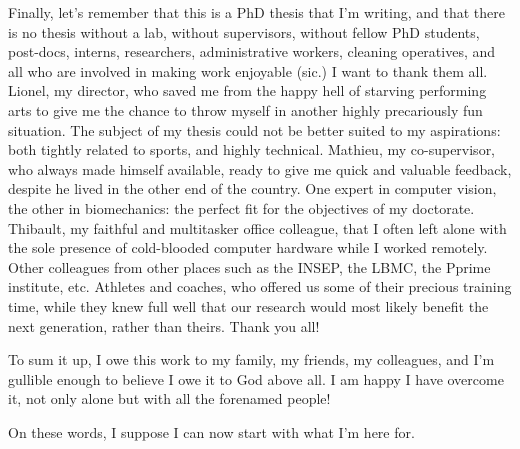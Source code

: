 Finally, let's remember that this is a PhD thesis that I'm writing, and that there is no thesis without a lab, without supervisors, without fellow PhD students, post-docs, interns, researchers, administrative workers, cleaning operatives, and all who are involved in making work enjoyable (sic.) I want to thank them all. Lionel, my director, who saved me from the happy hell of starving performing arts to give me the chance to throw myself in another highly precariously fun situation. The subject of my thesis could not be better suited to my aspirations: both tightly related to sports, and highly technical. Mathieu, my co-supervisor, who always made himself available, ready to give me quick and valuable feedback, despite he lived in the other end of the country. One expert in computer vision, the other in biomechanics: the perfect fit for the objectives of my doctorate. Thibault, my faithful and multitasker office colleague, that I often left alone with the sole presence of cold-blooded computer hardware while I worked remotely. Other colleagues from other places such as the INSEP, the LBMC, the Pprime institute, etc. Athletes and coaches, who offered us some of their precious training time, while they knew full well that our research would most likely benefit the next generation, rather than theirs. Thank you all!

To sum it up, I owe this work to my family, my friends, my colleagues, and I'm gullible enough to believe I owe it to God above all. I am happy I have overcome it, not only alone but with all the forenamed people!

On these words, I suppose I can now start with what I'm here for.